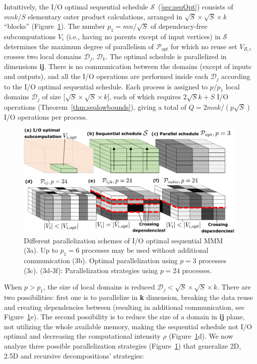 \documentclass[sigplan,review,anonymous,10pt]{acmart}\settopmatter{printfolios=true,printccs=false,printacmref=false}
\begin{document}
Intuitively, the 
I/O optimal sequential schedule $\mathcal{S}$~(\cref{sec:seqOpt})
consists of $mnk/S$ elementary outer product calculations, arranged in
$\sqrt{S} \times \sqrt{S} \times k$ ``blocks'' 
(Figure~\ref{fig:mmmParallelization}). The number $p_1 = mn/\sqrt{S}$ of 
dependency-free subcomputations 
$V_i$
(i.e., having no parents except of input vertices) in 
$\mathcal{S}$ 
determines the maximum 
degree 
of parallelism of $\mathcal{P}_{opt}$ for which no reuse set $V_{R,i}$ crosses 
two local 
domains 
$\mathcal{D}_j$, $\mathcal{D}_k$. The optimal schedule 
is parallelized in dimensions \textbf{ij}. There is no communication between 
the 
domains (except of inputs and outputs), and all the I/O operations are 
performed inside each $\mathcal{D}_j$ according to the I/O optimal sequential 
schedule. Each process is  assigned to $p/p_1$ local domains
$\mathcal{D}_j$ of size 
$\big[\sqrt{S} \times \sqrt{S} \times k\big]$, each of which requires 
$2\sqrt{S}k + S$ I/O 
operations (Theorem~\ref{thm:seqlowbounds}), giving a total of $Q = 
2mnk/(p\sqrt{S})$ I/O operations per process.


\begin{figure}
	\includegraphics[width=\columnwidth]{figures/mmm_parallelization}
	\caption{Different parallelization schemes of I/O optimal sequential MMM 
	(3a). 
	Up to $p_1 = 6$ processes may 
		be 
		used without additional communication (3b). 
		Optimal 
		parallelization using $p=3$ processes (3c). 
		(3d-3f):  Parallelization strategies 
		using $p=24$ processes.} 
	\label{fig:mmmParallelization}
\end{figure}

When $p > p_1$, the size of local domains is reduced $\mathcal{D}_j < \sqrt{S} 
\times \sqrt{S} \times k $. There are two possibilities: first one is to 
parallelize in \textbf{k} dimension, breaking the data reuse and creating
dependencies between (resulting in additional communication, see
Figure~\ref{fig:mmmParallelization}e). The second possibility is to reduce the 
size of a domain in \textbf{ij} plane, not utilizing the whole available
memory, making the sequential schedule not I/O optimal and decreasing the
computational intensity $\rho$ (Figure~\ref{fig:mmmParallelization}d). We
  now analyze three possible parallelization
  strategies (Figure~\ref{fig:mmmParallelization}) that generalize 2D, 2.5D and 
  recursive decompositions' strategies:
\end{document}

